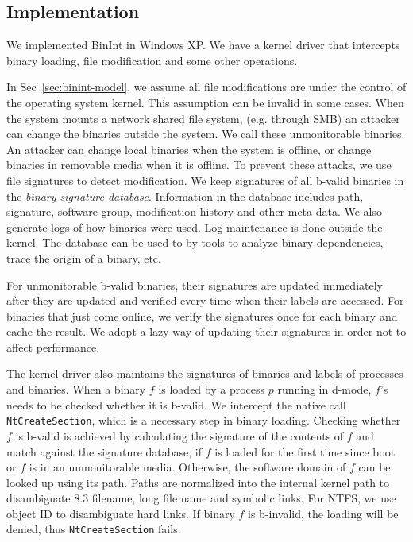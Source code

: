 \subsection{Implementation}
\label{sec:binint-imp}

We implemented BinInt in Windows XP.
We have a kernel driver that intercepts binary loading,
file modification and some other operations.

In Sec~\ref{sec:binint-model}, we assume all file modifications are under
the control of the operating system kernel.
This assumption can be invalid in some cases.
When the system mounts a network shared file system, (e.g. through SMB)
an attacker can change the binaries outside the system.
We call these unmonitorable binaries.
An attacker can change local binaries when the system is offline,
or change binaries in removable media when it is offline.
To prevent these attacks, we use file signatures to detect modification.
We keep signatures of all b-valid binaries in the
{\em binary signature database}.
Information in the database includes path, signature, software group,
modification history and other meta data.
We also generate logs of how binaries were used. Log maintenance is done
outside the kernel.
The database can be used to by tools to analyze binary dependencies,
trace the origin of a binary, etc.

For unmonitorable b-valid binaries, their signatures are updated
immediately after they are updated and verified every time when
their labels are accessed.
For binaries that just come online, we verify the signatures
once for each binary and cache the result.
We adopt a lazy way of updating their signatures in order
not to affect performance.

The kernel driver also maintains the signatures of binaries and
labels of processes and binaries.
When a binary $f$ is loaded by a process $p$ running in d-mode,
$f$'s needs to be checked whether it is b-valid.
We intercept the native call {\tt NtCreateSection},
which is a necessary step in binary loading.
Checking whether $f$ is b-valid is achieved by calculating 
the signature of the contents
of $f$ and match against the signature database, if $f$ is loaded for the first
time since boot or $f$ is in an unmonitorable media.
Otherwise, the software domain of $f$ can be looked up using its path.
Paths are normalized into
the internal kernel path to disambiguate 8.3 filename, long file name
and symbolic links.
For NTFS, we use object ID to disambiguate hard links.
If binary $f$ is b-invalid,
the loading will be denied, thus {\tt NtCreateSection} fails.

